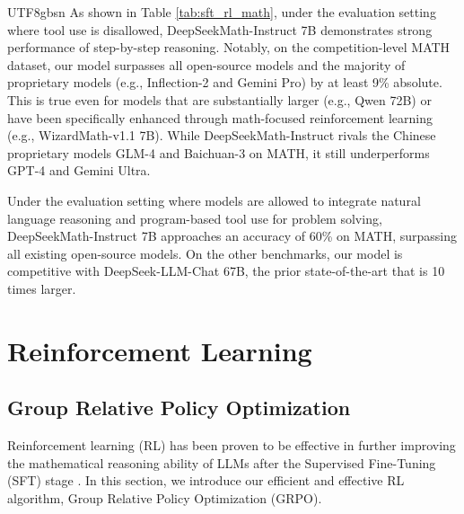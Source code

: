 \documentclass[11pt, a4paper, logo, copyright, nonumbering]{deepseek}
\newcommand{\spmath}{DeepSeekMath}
\begin{document}
\begin{CJK*}{UTF8}{gbsn}
As shown in Table \ref{tab:sft_rl_math}, under the evaluation setting where tool use is disallowed, \spmath-Instruct 7B demonstrates strong performance of step-by-step reasoning.
Notably, on the competition-level MATH dataset, our model surpasses all open-source models and the majority of proprietary models (e.g., Inflection-2 and Gemini Pro) by at least 9\% absolute.
This is true even for models that are substantially larger (e.g., Qwen 72B) or have been specifically enhanced through math-focused reinforcement learning (e.g., WizardMath-v1.1 7B).
While \spmath-Instruct rivals the Chinese proprietary models GLM-4 and Baichuan-3 on MATH, it still underperforms GPT-4 and Gemini Ultra.

Under the evaluation setting where models are allowed to integrate natural language reasoning and program-based tool use for problem solving, \spmath-Instruct 7B approaches an accuracy of 60\% on MATH, surpassing all existing open-source models.
On the other benchmarks, our model is competitive with DeepSeek-LLM-Chat 67B, the prior state-of-the-art that is 10 times larger.
\section{Reinforcement Learning}

\subsection{Group Relative Policy Optimization}
Reinforcement learning (RL) has been proven to be effective in further improving the mathematical reasoning ability of LLMs after the Supervised Fine-Tuning (SFT) stage \citep{wang2023math,wizardmath}.
In this section, we introduce our efficient and effective RL algorithm, Group Relative Policy Optimization (GRPO).





\end{CJK*}
\end{document}
